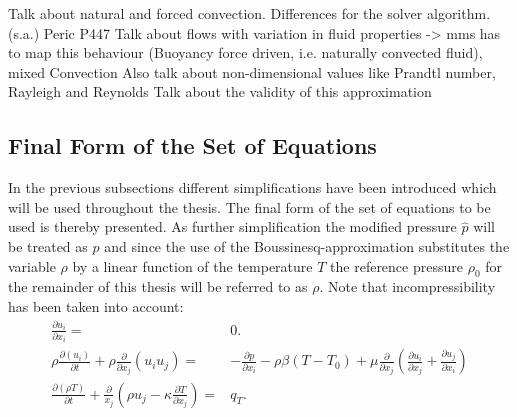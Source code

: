       Talk about natural and forced convection. Differences for the solver algorithm. (s.a.) Peric P447
      Talk about flows with variation in fluid properties -> mms has to map this behaviour (Buoyancy force driven, i.e. naturally convected fluid), mixed Convection
      Also talk about non-dimensional values like Prandtl number, Rayleigh and Reynolds
      Talk about the validity of this approximation
      
    \subsection{Final Form of the Set of Equations}

    In the previous subsections different simplifications have been introduced which will be used throughout the thesis. The final form of the set of equations to be used is thereby presented. As further simplification the modified pressure \(\hat{p}\) will be treated as \(p\) and since the use of the Boussinesq-approximation substitutes the variable \(\rho\) by a linear function of the temperature \(T\) the reference pressure \(\rho_0\) for the remainder of this thesis will be referred to as \(\rho\). Note that incompressibility has been taken into account:
    \begin{subequations}
      \label{eq:completeset}
    \begin{align}
      \label{eq:contidiff}
      \frac{\partial u_i}{\partial x_i} =& 0. \\[1em]
      \label{eq:momentumdiff}
        \rho \frac{\partial \left( u_i \right)}{\partial t} 
        + \rho \frac{\partial}{\partial x_j} \left( u_i  u_j \right) 
        =& - \frac{\partial p}{\partial x_i} 
        - \rho \beta \left( T - T_0 \right)
        +  \mu \frac{\partial}{\partial x_j} \left( \frac{\partial u_i}{\partial x_j} 
        + \frac{\partial u_j}{\partial x_i} \right) \\[1em]
    \label{eq:temperaturediff}
    \frac{\partial \left(\rho T \right)}{\partial t} + \frac{\partial}{x_j} \left( \rho u_j - \kappa \frac{\partial T}{\partial x_j} \right) =& q_T.
    \end{align}
  \end{subequations}
